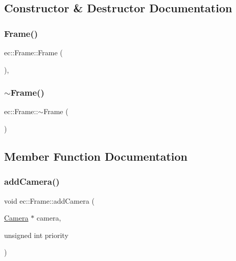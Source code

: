 \subsection{Constructor \& Destructor Documentation}
\mbox{\label{classec_1_1_frame_a80ed1da85818f646b6b80fb6c8a6c2a6}} 
\subsubsection{\texorpdfstring{Frame()}{Frame()}}
{\footnotesize\ttfamily ec\+::\+Frame\+::\+Frame (\begin{DoxyParamCaption}{ }\end{DoxyParamCaption})\hspace{0.3cm}{\ttfamily [explicit]}, {\ttfamily [default]}}

\mbox{\label{classec_1_1_frame_af2b2c733cacb47d99e460a2b75667eaa}} 
\subsubsection{\texorpdfstring{$\sim$\+Frame()}{~Frame()}}
{\footnotesize\ttfamily ec\+::\+Frame\+::$\sim$\+Frame (\begin{DoxyParamCaption}{ }\end{DoxyParamCaption})\hspace{0.3cm}{\ttfamily [default]}}



\subsection{Member Function Documentation}
\mbox{\label{classec_1_1_frame_a04ba39407bc0f6e78fe47f37b3f19131}} 
\subsubsection{\texorpdfstring{add\+Camera()}{addCamera()}}
{\footnotesize\ttfamily void ec\+::\+Frame\+::add\+Camera (\begin{DoxyParamCaption}\item[{\mbox{\hyperlink{classec_1_1_camera}{Camera}} $\ast$}]{camera,  }\item[{unsigned int}]{priority }\end{DoxyParamCaption})}

